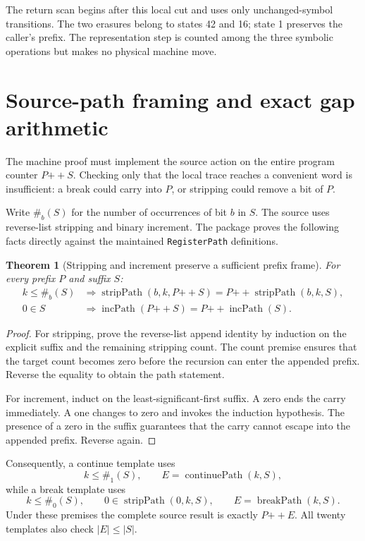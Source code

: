 \documentclass[11pt]{article}
\newtheorem{theorem}{Theorem}[section]
\theoremstyle{definition}\newtheorem{definition}[theorem]{Definition}
\theoremstyle{remark}\newtheorem{remark}[theorem]{Remark}
\newcommand{\cat}{\mathbin{+\!+}}
\newcommand{\code}[1]{\nolinkurl{#1}}
\begin{document}
The return scan begins after this local cut and uses only unchanged-symbol transitions. The two erasures belong to states 42 and 16; state 1 preserves the caller's prefix. The representation step is counted among the three symbolic operations but makes no physical machine move.

\section{Source-path framing and exact gap arithmetic}

The machine proof must implement the source action on the entire program counter $P\cat S$. Checking only that the local trace reaches a convenient word is insufficient: a break could carry into $P$, or stripping could remove a bit of $P$.

Write $\#_b(S)$ for the number of occurrences of bit $b$ in $S$. The source uses reverse-list stripping and binary increment. The package proves the following facts directly against the maintained \code{RegisterPath} definitions.

\begin{theorem}[Stripping and increment preserve a sufficient prefix frame]
For every prefix $P$ and suffix $S$:
\begin{align*}
 k\leq\#_b(S)&\Longrightarrow
 \operatorname{stripPath}(b,k,P\cat S)
   =P\cat\operatorname{stripPath}(b,k,S),\\
 0\in S&\Longrightarrow
 \operatorname{incPath}(P\cat S)=P\cat\operatorname{incPath}(S).
\end{align*}
\end{theorem}
\begin{proof}
For stripping, prove the reverse-list append identity by induction on the explicit suffix and the remaining stripping count. The count premise ensures that the target count becomes zero before the recursion can enter the appended prefix. Reverse the equality to obtain the path statement.

For increment, induct on the least-significant-first suffix. A zero ends the carry immediately. A one changes to zero and invokes the induction hypothesis. The presence of a zero in the suffix guarantees that the carry cannot escape into the appended prefix. Reverse again.
\end{proof}

Consequently, a continue template uses
\[
 k\leq\#_1(S),\qquad E=\operatorname{continuePath}(k,S),
\]
while a break template uses
\[
 k\leq\#_0(S),\qquad
 0\in\operatorname{stripPath}(0,k,S),\qquad
 E=\operatorname{breakPath}(k,S).
\]
Under these premises the complete source result is exactly $P\cat E$. All twenty templates also check $|E|\leq|S|$.
\end{document}
